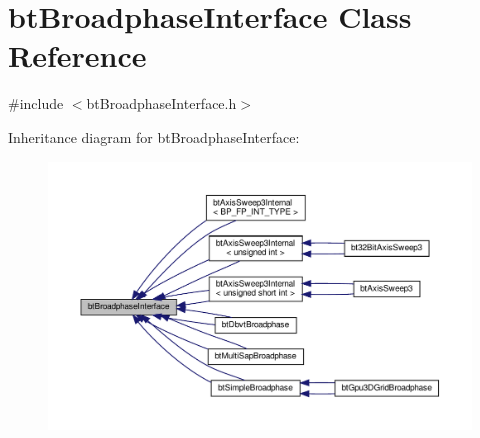 \hypertarget{classbtBroadphaseInterface}{}\section{bt\+Broadphase\+Interface Class Reference}
\label{classbtBroadphaseInterface}


{\ttfamily \#include $<$bt\+Broadphase\+Interface.\+h$>$}



Inheritance diagram for bt\+Broadphase\+Interface\+:
\nopagebreak
\begin{figure}[H]
\begin{center}
\leavevmode
\includegraphics[width=350pt]{classbtBroadphaseInterface__inherit__graph}
\end{center}
\end{figure}

